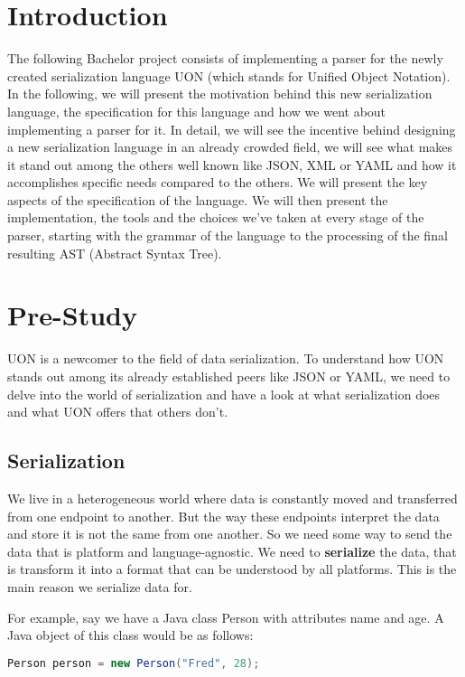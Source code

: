\documentclass[12pt]{article}
\begin{document}
\section{Introduction}
The following Bachelor project consists of implementing a parser for the newly created serialization language UON (which stands for Unified Object Notation). In the following, we will present the motivation behind this new serialization language, the specification for this language and how we went about implementing a parser for it. In detail, we will see the incentive behind designing a new serialization language in an already crowded field, we will see what makes it stand out among the others well known like JSON, XML or YAML and how it accomplishes specific needs compared to the others. We will present the key aspects of the specification of the language. We will then present the implementation, the tools and the choices we’ve taken at every stage of the parser, starting with the grammar of the language to the processing of the final resulting AST (Abstract Syntax Tree).

\pagebreak

\section{Pre-Study}
UON is a newcomer to the field of data serialization. To understand how UON stands out among its already established peers like JSON or YAML, we need to delve into the world of serialization and have a look at what serialization does and what UON offers that others don’t.

\subsection{Serialization}
We live in a heterogeneous world where data is constantly moved and transferred from one endpoint to another. But the way these endpoints interpret the data and store it is not the same from one another. So we need some way to send the data that is platform and language-agnostic. We need to \textbf{serialize} the data, that is transform it into a format that can be understood by all platforms. This is the main reason we serialize data for.

For example, say we have a Java class Person with attributes name and age. A Java object of this class would be as follows:

\begin{lstlisting}[language=java]
Person person = new Person("Fred", 28);
\end{lstlisting}
\end{document}
